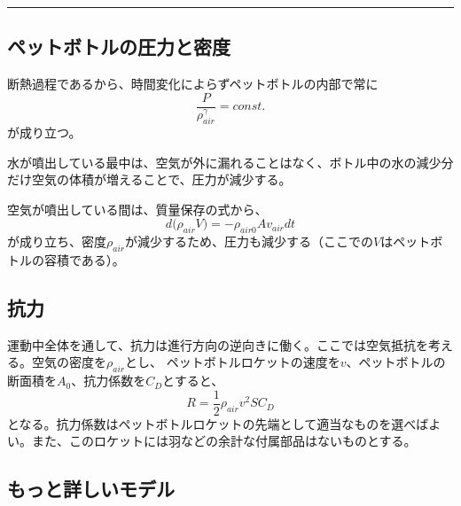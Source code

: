 \documentclass{article}
\begin{document}
\vspace{3mm}
\hrule
\vspace{3mm}

\subsection{ ペットボトルの圧力と密度 }

断熱過程であるから、時間変化によらずペットボトルの内部で常に
\begin{equation}
\frac{P}{\rho_{air}^\gamma} = const.
\end{equation}
が成り立つ。

水が噴出している最中は、空気が外に漏れることはなく、ボトル中の水の減少分だけ空気の体積が増えることで、圧力が減少する。

空気が噴出している間は、質量保存の式から、
\begin{equation}
d ({\rho_{air}V)} = - \rho_{air0} A v_{air} dt
\end{equation}
が成り立ち、密度$\rho_{air}$が減少するため、圧力も減少する（ここでの$V$はペットボトルの容積である）。

\subsection{ 抗力 }

運動中全体を通して、抗力は進行方向の逆向きに働く。ここでは空気抵抗を考える。空気の密度を$\rho_{air}$とし、
ペットボトルロケットの速度を$v$、ペットボトルの断面積を$A_0$、抗力係数を$C_D$とすると、
\begin{equation}
R = \frac{1}{2}\rho_{air}v^2 S C_D
\end{equation}
となる。抗力係数はペットボトルロケットの先端として適当なものを選べばよい。また、このロケットには羽などの余計な付属部品はないものとする。

\subsection{ もっと詳しいモデル }
\end{document}
